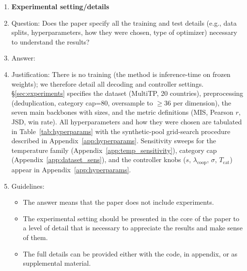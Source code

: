 \begin{enumerate}
\item {\bf Experimental setting/details}
    \item[] Question: Does the paper specify all the training and test details (e.g., data splits, hyperparameters, how they were chosen, type of optimizer) necessary to understand the results?
    \item[] Answer: \answerYes{}
    \item[] Justification: There is no training (the method is inference-time on frozen weights); we therefore detail all decoding and controller settings. \S\ref{sec:experiments} specifies the dataset (MultiTP, 20 countries), preprocessing (deduplication, category cap=80, oversample to $\geq$36 per dimension), the seven main backbones with sizes, and the metric definitions (MIS, Pearson $r$, JSD, win rate). All hyperparameters and how they were chosen are tabulated in Table~\ref{tab:hyperparams} with the synthetic-pool grid-search procedure described in Appendix~\ref{app:hyperparams}. Sensitivity sweeps for the temperature family (Appendix~\ref{app:temp_sensitivity}), category cap (Appendix~\ref{app:dataset_sens}), and the controller knobs ($s$, $\lambda_{\text{coop}}$, $\sigma$, $T_{\text{cat}}$) appear in Appendix~\ref{app:hyperparams}.
    \item[] Guidelines:
    \begin{itemize}
        \item The answer \answerNA{} means that the paper does not include experiments.
        \item The experimental setting should be presented in the core of the paper to a level of detail that is necessary to appreciate the results and make sense of them.
        \item The full details can be provided either with the code, in appendix, or as supplemental material.
    \end{itemize}


\end{enumerate}
